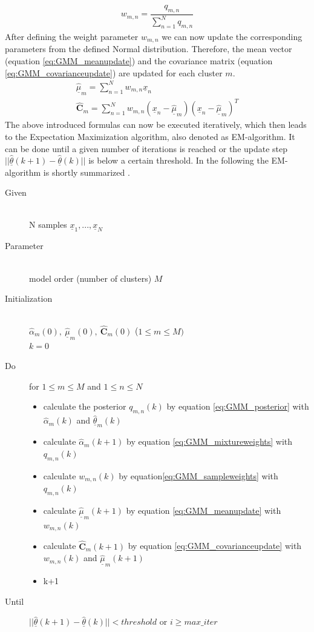 \documentclass[12pt,DIV14,BCOR12mm,a4paper,footexclude,headinclude,halfparskip-,twoside,openright,openany,cleardoubleempty,idxtotoc,bibtotoc]{scrreprt} %
\numberwithin{equation}{chapter}
\begin{document}
\begin{align}
	w_{m,n} = \dfrac{q_{m,n}}{\sum_{n=1}^{N}q_{m,n}}\label{eq:GMM_sampleweights}
\end{align}
After defining the weight parameter $w_{m,n}$ we can now update the corresponding parameters from the defined Normal distribution. Therefore, the mean vector (equation \ref{eq:GMM_meanupdate}) and the covariance matrix (equation \ref{eq:GMM_covarianceupdate}) are updated for each cluster $m$.
\begin{align}
	\hat{\underline{\mu}}_m = \sum_{n=1}^{N}w_{m,n}\underline{x}_n\label{eq:GMM_meanupdate}\\
	\hat{\mathbf{C}}_m = \sum_{n=1}^{N}w_{m,n}(\underline{x}_n-\hat{\underline{\mu}}_m)(\underline{x}_n-\hat{\underline{\mu}}_m)^{T}\label{eq:GMM_covarianceupdate}	
\end{align}
The above introduced formulas can now be executed iteratively, which then leads to the Expectation Maximization algorithm, also denoted as EM-algorithm. It can be done until a given number of iterations is reached or the update step $||\hat{\underline{\theta}}(k+1) - \hat{\underline{\theta}}(k)||$ is below a certain threshold. In the following the EM-algorithm is shortly summarized \cite{LectureNotes_DPR}.
\begin{description}
	\item[Given]\hfill \\
		N samples $\underline{x}_{1},...,\underline{x}_{N}$
	\item[Parameter]\hfill \\
		model order (number of clusters) $M$
	\item[Initialization]\hfill \\
		$\hat{\alpha}_m(0),\ \hat{\underline{\mu}}_m(0),\ \hat{\mathbf{C}}_m(0)$ ($1 \leq m \leq M)$\\
		$k = 0$
	\item[Do]  for $1 \leq m \leq M$ and $1 \leq n \leq N$\hfill
		\begin{itemize}
			\item calculate the posterior $q_{m,n}(k)$ by equation \ref{eq:GMM_posterior} with $\hat{\alpha}_m(k)$ and $\hat{\underline{\theta}}_m(k)$
			\item calculate $\hat{\alpha}_m(k+1)$ by equation \ref{eq:GMM_mixtureweights} with $q_{m,n}(k)$
			\item calculate $w_{m,n}(k)$ by equation\ref{eq:GMM_sampleweights} with $q_{m,n}(k)$
			\item calculate $\hat{\underline{\mu}}_m(k+1)$ by equation \ref{eq:GMM_meanupdate} with $w_{m,n}(k)$
			\item calculate $\hat{\mathbf{C}}_m(k+1)$ by equation \ref{eq:GMM_covarianceupdate} with $w_{m,n}(k)$ and $\hat{\underline{\mu}}_m(k+1)$
			\item k+1
		\end{itemize}
	\item[Until] $||\hat{\underline{\theta}}(k+1) - \hat{\underline{\theta}}(k)|| < threshold$ or $i \geq max\_iter$
\end{description}
\end{document}
